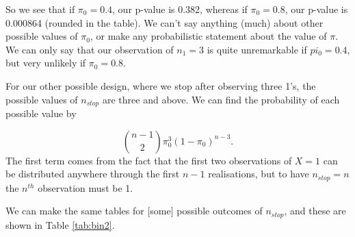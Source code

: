 \documentclass[
  openany]{book}
\theoremstyle{definition}
\theoremstyle{definition}
\theoremstyle{definition}
\theoremstyle{definition}
\theoremstyle{remark}
\begin{document}
So we see that if \(\pi_0=0.4\), our p-value is 0.382, whereas if \(\pi_0=0.8\), our p-value is 0.000864 (rounded in the table). We can't say anything (much) about other possible values of \(\pi_0\), or make any probabilistic statement about the value of \(\pi\). We can only say that our observation of \(n_1=3\) is quite unremarkable if \(pi_0=0.4\), but very unlikely if \(\pi_0=0.8\).

For our other possible design, where we stop after observing three 1's, the possible values of \(n_{stop}\) are three and above.
We can find the probability of each possible value by

\[ \binom{n-1}{2} \pi_0^3\left(1-\pi_0\right)^{n-3}.\]
The first term comes from the fact that the first two observations of \(X=1\) can be distributed anywhere through the first \(n-1\) realisations, but to have \(n_{stop}=n\) the \(n^{th}\) observation must be 1.

We can make the same tables for {[}some{]} possible outcomes of \(n_{stop}\), and these are shown in Table \ref{tab:bin2}.
\end{document}
